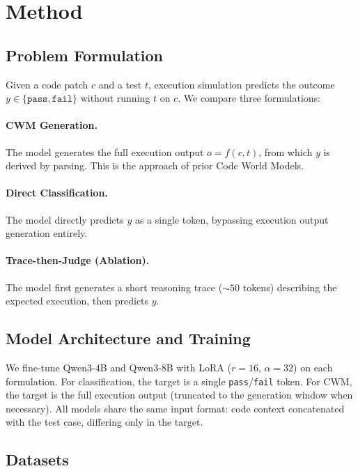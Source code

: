 \documentclass[11pt,a4paper]{article}
\begin{document}
\section{Method}

\subsection{Problem Formulation}

Given a code patch $c$ and a test $t$, execution simulation predicts the outcome $y \in \{\texttt{pass}, \texttt{fail}\}$ without running $t$ on $c$.
We compare three formulations:

\paragraph{CWM Generation.} The model generates the full execution output $o = f(c, t)$, from which $y$ is derived by parsing.
This is the approach of prior Code World Models.

\paragraph{Direct Classification.} The model directly predicts $y$ as a single token, bypassing execution output generation entirely.

\paragraph{Trace-then-Judge (Ablation).} The model first generates a short reasoning trace (${\sim}50$ tokens) describing the expected execution, then predicts $y$.

\subsection{Model Architecture and Training}

We fine-tune Qwen3-4B and Qwen3-8B with LoRA ($r{=}16$, $\alpha{=}32$) on each formulation.
For classification, the target is a single \texttt{pass}/\texttt{fail} token.
For CWM, the target is the full execution output (truncated to the generation window when necessary).
All models share the same input format: code context concatenated with the test case, differing only in the target.

\subsection{Datasets}
\end{document}
